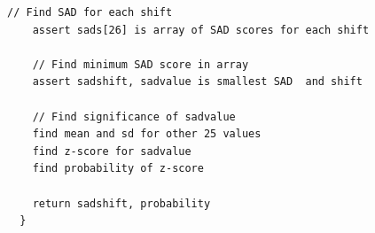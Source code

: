 \documentclass{article}
\begin{document}
\begin{description}
\begin{Verbatim}[frame=single,label=bestShift]
    // Find SAD for each shift
    assert sads[26] is array of SAD scores for each shift

    // Find minimum SAD score in array
    assert sadshift, sadvalue is smallest SAD  and shift

    // Find significance of sadvalue
    find mean and sd for other 25 values
    find z-score for sadvalue
    find probability of z-score

    return sadshift, probability
  }  
\end{Verbatim}

\end{description}
\end{document}
